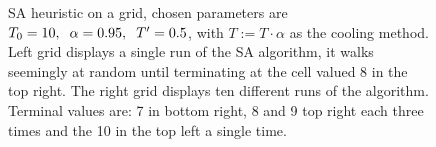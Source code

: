 \begin{figure}[h]
\begin{subfigure}{0.4\textwidth}
\begin{tikzpicture}
        \end{tikzpicture}
    \end{subfigure}
    \caption{SA heuristic on a grid, chosen parameters are $T_0 = 10,\hspace{2mm} \alpha = 0.95,\hspace{2mm} T' = 0.5$, with $T := T\cdot \alpha$ as the cooling method. Left grid displays a single run of the SA algorithm, it walks seemingly at random until terminating at the cell valued 8 in the top right. The right grid displays ten different runs of the algorithm. Terminal values are: 7 in bottom right, 8 and 9 top right each three times and the 10 in the top left a single time.}
    \label{fig:simanealling}
\end{figure}

